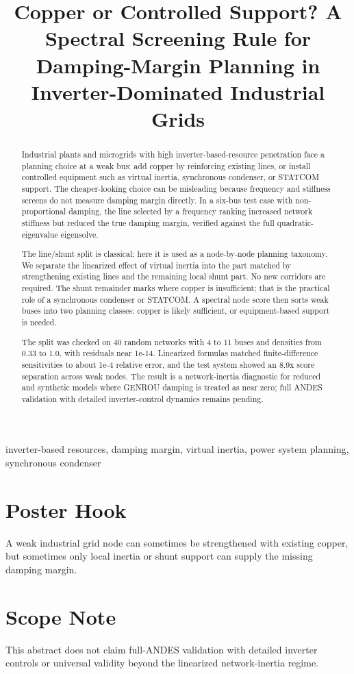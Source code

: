 \documentclass[conference]{IEEEtran}
\title{Copper or Controlled Support? A Spectral Screening Rule for Damping-Margin Planning in Inverter-Dominated Industrial Grids}
\author{\IEEEauthorblockN{Jorge L. Mayorga Taborda}
\IEEEauthorblockA{Universidad de los Andes\\
Bogota, Colombia}}
\begin{document}
\maketitle

\begin{abstract}
Industrial plants and microgrids with high inverter-based-resource penetration face a planning choice at a weak bus: add copper by reinforcing existing lines, or install controlled equipment such as virtual inertia, synchronous condenser, or STATCOM support. The cheaper-looking choice can be misleading because frequency and stiffness screens do not measure damping margin directly. In a six-bus test case with non-proportional damping, the line selected by a frequency ranking increased network stiffness but reduced the true damping margin, verified against the full quadratic-eigenvalue eigensolve.

The line/shunt split is classical; here it is used as a node-by-node planning taxonomy. We separate the linearized effect of virtual inertia into the part matched by strengthening existing lines and the remaining local shunt part. No new corridors are required. The shunt remainder marks where copper is insufficient; that is the practical role of a synchronous condenser or STATCOM. A spectral node score then sorts weak buses into two planning classes: copper is likely sufficient, or equipment-based support is needed.

The split was checked on 40 random networks with 4 to 11 buses and densities from 0.33 to 1.0, with residuals near 1e-14. Linearized formulas matched finite-difference sensitivities to about 1e-4 relative error, and the test system showed an 8.9x score separation across weak nodes. The result is a network-inertia diagnostic for reduced and synthetic models where GENROU damping is treated as near zero; full ANDES validation with detailed inverter-control dynamics remains pending.
\end{abstract}

\begin{IEEEkeywords}
inverter-based resources, damping margin, virtual inertia, power system planning, synchronous condenser
\end{IEEEkeywords}

\section*{Poster Hook}
A weak industrial grid node can sometimes be strengthened with existing copper, but sometimes only local inertia or shunt support can supply the missing damping margin.

\section*{Scope Note}
This abstract does not claim full-ANDES validation with detailed inverter controls or universal validity beyond the linearized network-inertia regime.
\end{document}
